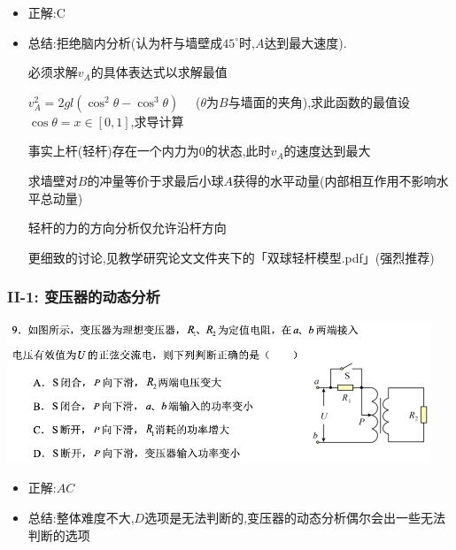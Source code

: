 \documentclass{article}
\begin{document}
\begin{itemize}
    \item 正解:\quad C
    \item 总结:\quad 拒绝脑内分析(认为杆与墙壁成$45^\circ$时,$A$达到最大速度).

          \hspace{3.2em}必须求解$v_{A}$的具体表达式以求解最值

          \hspace{3.2em}$v_{A}^{2} = 2gl (\cos^{2}{\theta} - \cos^{3}{\theta}) \quad$ ($\theta$为$B$与墙面的夹角),求此函数的最值设$\cos{\theta} = x \in [0,1]$,求导计算

          \hspace{3.2em}事实上杆(轻杆)存在一个内力为$0$的状态,此时$v_{A}$的速度达到最大

          \hspace{3.2em}求墙壁对$B$的冲量等价于求最后小球$A$获得的水平动量(内部相互作用不影响水平总动量)

          \hspace{3.2em}轻杆的力的方向分析仅允许沿杆方向

          \hspace{3.2em}更细致的讨论,见教学研究论文文件夹下的「双球轻杆模型.pdf」(强烈推荐)
\end{itemize}

\vspace{2em}

\subsubsection{II-1: 变压器的动态分析}
\includegraphics[width=0.95\textwidth,keepaspectratio]{./pictures/3.11-2.png}


\begin{itemize}
    \item 正解:\quad $AC$
    \item 总结:\quad 整体难度不大,$D$选项是无法判断的,变压器的动态分析偶尔会出一些无法判断的选项
\end{itemize}
\end{document}
